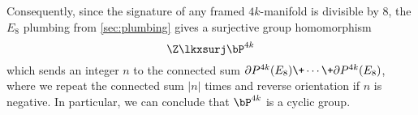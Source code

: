 Consequently, since the signature of any framed $4k$-manifold is divisible by $8$, the $E_8$ plumbing from \cref{sec:plumbing} gives a surjective group homomorphism 
\begin{equation}\label{eq:plumbing-map}
		\Z \lkxsurj \bP^{4k}
\end{equation}
which sends an integer $n$ to the connected sum $\partial P^{4k}(E_8)\+\cdots \+ \partial P^{4k}(E_8)$, where we repeat the connected sum $|n|$ times and reverse orientation if $n$ is negative. In particular, we can conclude that $\bP^{4k}$ is a cyclic group. 

%
%

